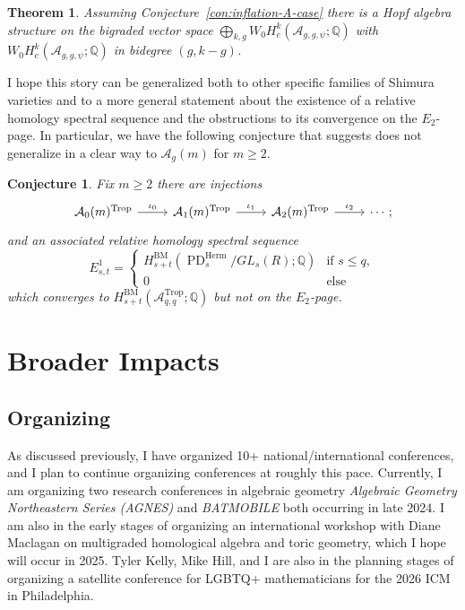 \documentclass[11pt,reqno]{amsart}
\newtheorem{theorem}[lemma]{Theorem}
\newtheorem{conj}[lemma]{Conjecture}
\theoremstyle{remark}
\newcommand{\GL}{{GL}}
\newcommand{\QQ}{\mathbb{Q}}
\newcommand{\cA}{\mathcal{A}}
\DeclareMathOperator{\Trop}{Trop}
\DeclareMathOperator{\PD}{PD}
\begin{document}
\begin{theorem}
Assuming Conjecture~\ref{con:inflation-A-case} there is a Hopf algebra structure on the bigraded vector space $\bigoplus_{k,g} W_0 H^k_c(\cA_{g,g,\psi};\QQ)$
with $ W_0 H^k_c(\cA_{g,g,\psi};\QQ)$ in bidegree $(g,k-g)$.
\end{theorem}

I hope this story can be generalized both to other specific families of Shimura varieties and to a more general statement about the existence of a relative homology spectral sequence and the obstructions to its convergence on the $E_{2}$-page. In particular, we have the following conjecture that suggests \cite[Theorem 1.1]{BCGP24} does not generalize in a clear way to $\cA_{g}(m)$ for $m\geq2$.

\begin{conj}
Fix $m\geq2$ there are injections
\[
\begin{tikzcd}
\cA_{0}(m)^{\Trop} \arrow[r, "\iota_{0}"] & \cA_{1}(m)^{\Trop}  \arrow[r, "\iota_{1}"] & \cA_{2}(m)^{\Trop}  \arrow[r, "\iota_{2}"] &\cdots;
\end{tikzcd}
\]
and an associated relative homology spectral sequence
\[E^1_{s,t} = \begin{cases} H^{\mathrm{BM}}_{s+t} (\PD^\mathrm{Herm}_s/\GL_s(R);\QQ) & \text{if }s \le q,\\ 0 & \text{else}\end{cases}\]
which converges to $H_{s+t}^{\mathrm{BM}} (\cA_{q,q}^{\Trop};\QQ)$ but not on the $E_2$-page. 
\end{conj} 

\section{Broader Impacts}\label{sec:broader-impacts} 

\subsection{Organizing} As discussed previously, I have organized 10+ national/international conferences, and I plan to continue organizing conferences at roughly this pace. Currently, I am organizing two research conferences in algebraic geometry \textit{Algebraic Geometry Northeastern Series (AGNES)} and \textit{BATMOBILE} both occurring in late 2024. I am also in the early stages of organizing an international workshop with Diane Maclagan on multigraded homological algebra and toric geometry, which I hope will occur in 2025. Tyler Kelly, Mike Hill, and I are also in the planning stages of organizing a satellite conference for LGBTQ+ mathematicians for the 2026 ICM in Philadelphia. 
\end{document}
